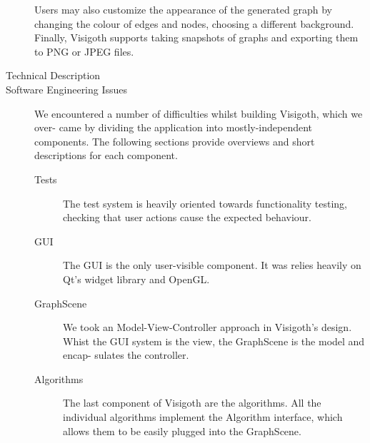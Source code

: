 \documentclass[a4paper,11pt]{article}
\begin{document}
\begin{description}
  Users may also customize the appearance of the generated graph by
  changing the colour of edges and nodes, choosing a different
  background. Finally, Visigoth supports taking snapshots of graphs
  and exporting them to PNG or JPEG files.

\item[Technical Description]

\item[Software Engineering Issues]

  We encountered a number of difficulties whilst building Visigoth,
  which we over- came by dividing the application into
  mostly-independent components.  The following sections provide
  overviews and short descriptions for each component.

  \begin{description}
  \item[Tests] The test system is heavily oriented towards
    functionality testing, checking that user actions cause the
    expected behaviour.

  \item[GUI] The GUI is the only user-visible component. It was relies
    heavily on Qt's widget library and OpenGL.

  \item[GraphScene] We took an Model-View-Controller approach in
    Visigoth's design. Whist the GUI system is the view, the
    GraphScene is the model and encap- sulates the controller.

  \item[Algorithms] The last component of Visigoth are the
    algorithms. All the individual algorithms implement the Algorithm
    interface, which allows them to be easily plugged into the
    GraphScene.
  \end{description}


\end{description}
\end{document}
